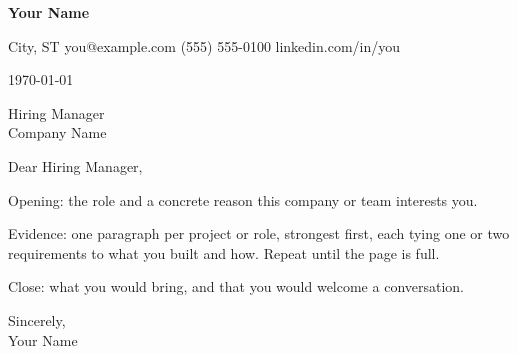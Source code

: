 \documentclass[11pt]{article}
\makeatletter
\newcommand{\myname}{Your Name}
\newcommand{\mycontact}{City, ST \quad\textbar\quad you@example.com \quad\textbar\quad (555) 555-0100 \quad\textbar\quad linkedin.com/in/you}
\newcommand{\letterdate}{\today}
\newcommand{\addressee}{Hiring Manager}
\newcommand{\company}{Company Name}
\makeatother
\begin{document}
{\LARGE\bfseries \myname}\par
\vspace{2pt}
{\small \mycontact}\par
\vspace{16pt}

\letterdate

\addressee\\
\company

Dear \addressee,

Opening: the role and a concrete reason this company or team interests you.

Evidence: one paragraph per project or role, strongest first, each tying one or two requirements to what you
built and how. Repeat until the page is full.

Close: what you would bring, and that you would welcome a conversation.

Sincerely,\\[6pt]
\myname
\end{document}
